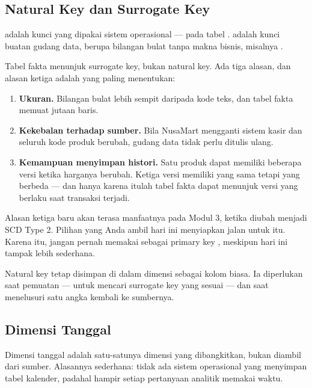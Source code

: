 \subsection{Natural Key dan Surrogate Key}

 adalah kunci yang dipakai sistem operasional ---
 pada tabel . 
adalah kunci buatan gudang data, berupa bilangan bulat tanpa makna bisnis,
misalnya .

Tabel fakta menunjuk surrogate key, bukan natural key. Ada tiga alasan, dan
alasan ketiga adalah yang paling menentukan:

\begin{enumerate}[leftmargin=1.4em]
  \item \textbf{Ukuran.} Bilangan bulat lebih sempit daripada kode teks, dan
        tabel fakta memuat jutaan baris.
  \item \textbf{Kekebalan terhadap sumber.} Bila NusaMart mengganti sistem
        kasir dan seluruh kode produk berubah, gudang data tidak perlu ditulis
        ulang.
  \item \textbf{Kemampuan menyimpan histori.} Satu produk dapat memiliki
        beberapa versi ketika harganya berubah. Ketiga versi memiliki
         yang sama tetapi  yang
        berbeda --- dan hanya karena itulah tabel fakta dapat menunjuk versi
        yang berlaku saat transaksi terjadi.
\end{enumerate}

\begin{catatan}
Alasan ketiga baru akan terasa manfaatnya pada Modul 3, ketika
 diubah menjadi SCD Type 2. Pilihan yang Anda ambil hari
ini menyiapkan jalan untuk itu. Karena itu, jangan pernah memakai
 sebagai primary key , meskipun hari
ini tampak lebih sederhana.
\end{catatan}

Natural key tetap disimpan di dalam dimensi sebagai kolom biasa. Ia diperlukan
saat pemuatan --- untuk mencari surrogate key yang sesuai --- dan saat
menelusuri satu angka kembali ke sumbernya.

\subsection{Dimensi Tanggal}

Dimensi tanggal adalah satu-satunya dimensi yang dibangkitkan, bukan diambil
dari sumber. Alasannya sederhana: tidak ada sistem operasional yang menyimpan
tabel kalender, padahal hampir setiap pertanyaan analitik memakai waktu.


